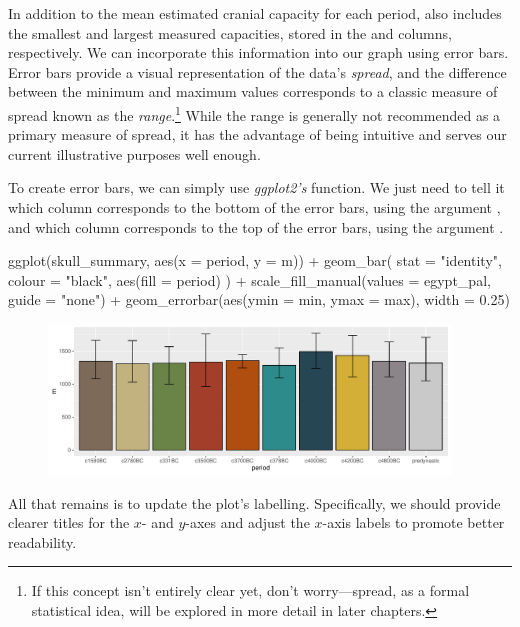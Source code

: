 In addition to the mean estimated cranial capacity for each period,  also includes the smallest and largest measured capacities, stored in the  and  columns, respectively. We can incorporate this information into our graph using \glspl{error bar}. Error bars provide a visual representation of the data's \textit{spread}, and the difference between the minimum and maximum values corresponds to a classic measure of spread known as the \textit{range}.\footnote{If this concept isn’t entirely clear yet, don’t worry—spread, as a formal statistical idea, will be explored in more detail in later chapters.} While the range is generally not recommended as a primary measure of spread, it has the advantage of being intuitive and serves our current illustrative purposes well enough.

To create error bars, we can simply use \textit{ggplot2's}  function. We just need to tell it which column corresponds to the bottom of the error bars, using the argument , and which column corresponds to the top of the error bars, using the argument .

\begin{inR}
ggplot(skull_summary, aes(x = period, y = m)) +
  geom_bar(
    stat = "identity",
    colour = "black",
    aes(fill = period)
  ) +
  scale_fill_manual(values = egypt_pal, guide = "none") +
  geom_errorbar(aes(ymin = min, ymax = max), width = 0.25)
\end{inR}

\vspace{2em}

\begin{figure}[H]
\includegraphics[width = 0.95\textwidth]{graphics/ch3Figs/bar_4.pdf}
\end{figure}

All that remains is to update the plot’s labelling. Specifically, we should provide clearer titles for the $x$- and $y$-axes and adjust the $x$-axis labels to promote better readability.

